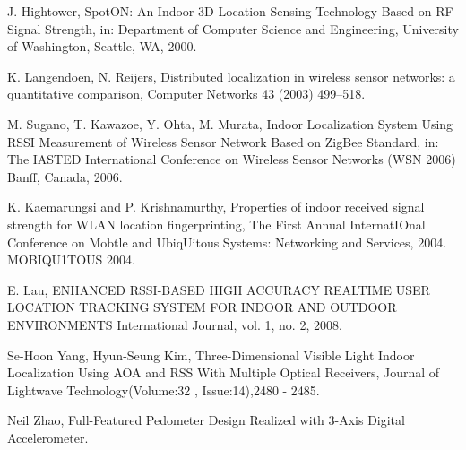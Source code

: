 \documentclass[conference]{IEEEtran}
\begin{document}
\begin{thebibliography}{1}
J. Hightower, SpotON: An Indoor 3D Location Sensing Technology Based on RF
Signal Strength, in: Department of Computer Science and Engineering,
University of Washington, Seattle, WA, 2000.

K. Langendoen, N. Reijers, Distributed localization in wireless sensor networks:
a quantitative comparison, Computer Networks 43 (2003) 499–518.

M. Sugano, T. Kawazoe, Y. Ohta, M. Murata, Indoor Localization System Using
RSSI Measurement of Wireless Sensor Network Based on ZigBee Standard, in:
The IASTED International Conference on Wireless Sensor Networks (WSN
2006) Banff, Canada, 2006.

K. Kaemarungsi and P. Krishnamurthy, Properties of indoor
received signal strength for WLAN location fingerprinting, The First Annual InternatIOnal Conference on Mobtle and UbiqUitous
Systems: Networking and Services, 2004. MOBIQU1TOUS 2004.

E. Lau, ENHANCED RSSI-BASED HIGH ACCURACY REALTIME USER LOCATION TRACKING SYSTEM FOR INDOOR AND OUTDOOR ENVIRONMENTS International Journal, vol. 1, no. 2, 2008. 

Se-Hoon Yang, Hyun-Seung Kim, Three-Dimensional Visible Light Indoor Localization Using AOA and RSS With Multiple Optical Receivers, Journal of Lightwave Technology(Volume:32 ,  Issue:14),2480 - 2485.

Neil Zhao, Full-Featured Pedometer Design Realized with 3-Axis Digital Accelerometer.

\end{thebibliography}






\end{document}
